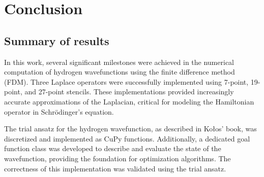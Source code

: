 \section{Conclusion}

\subsection{Summary of results}

%
%
%
%
%
%
%
%
%
%
%
%

In this work, several significant milestones were achieved in the numerical computation of hydrogen wavefunctions using the finite difference method (FDM). Three Laplace operators were successfully implemented using 7-point, 19-point, and 27-point stencils. These implementations provided increasingly accurate approximations of the Laplacian, critical for modeling the Hamiltonian operator in Schrödinger’s equation.

The trial ansatz for the hydrogen wavefunction, as described in Kołos’ book, was discretized and implemented as CuPy functions. Additionally, a dedicated goal function class was developed to describe and evaluate the state of the wavefunction, providing the foundation for optimization algorithms. The correctness of this implementation was validated using the trial ansatz.

